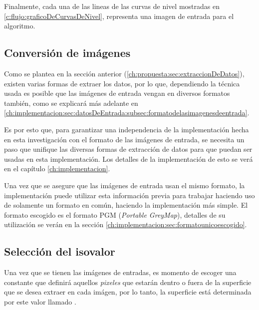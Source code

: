 Finalmente, cada una de las lineas de las curvas de nivel mostradas en \ref{c:flujo:graficoDeCurvasDeNivel}, representa una imagen de entrada para el algoritmo.

\subsection{Conversión de imágenes}
\label{ch:propuesta:sec:conversionDeImagenes}

Como se plantea en la sección anterior (\ref{ch:propuesta:sec:extraccionDeDatos}), existen varias formas de extraer los datos, por lo que, dependiendo la técnica usada es posible que las imágenes de entrada vengan en diversos formatos también, como se explicará más adelante en \ref{ch:implementacion:sec:datosDeEntrada:subsec:formatodelasimagenesdeentrada}.

Es por esto que, para garantizar una independencia de la implementación hecha en esta investigación con el formato de las imágenes de entrada, se necesita un paso que unifique las diversas formas de extracción de datos para que puedan ser usadas en esta implementación.
Los detalles de la implementación de esto se verá en el capítulo \ref{ch:implementacion}.

Una vez que se asegure que las imágenes de entrada usan el mismo formato, la implementación puede utilizar esta información previa para trabajar haciendo uso de solamente un formato en común, haciendo la implementación más simple. El formato escogido es el formato PGM (\emph{Portable GreyMap}), detalles de su utilización se verán en la sección \ref{ch:implementacion:sec:formatounicoescogido}.

\subsection{Selección del isovalor}
\label{ch:propuesta:sec:seleccionDelIsovalor}

Una vez que se tienen las imágenes de entradas, es momento de escoger una constante que definirá aquellos \emph{pixeles} que estarán dentro o fuera de la superficie que se desea extraer en cada imágen, por lo tanto, la superficie está determinada por este valor llamado .


